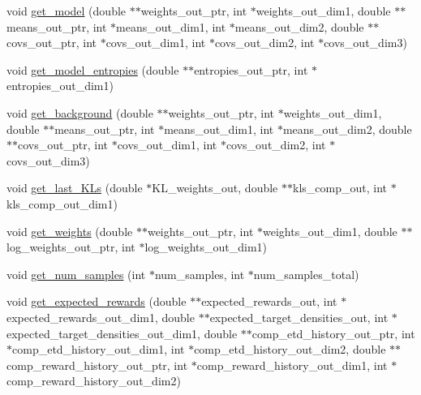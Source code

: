 \begin{DoxyCompactItemize}
void \hyperlink{classVIPS__PythonWrapper_acb7c2dea0de7913cc96a8d9511cd96a8}{get\+\_\+model} (double $\ast$$\ast$weights\+\_\+out\+\_\+ptr, int $\ast$weights\+\_\+out\+\_\+dim1, double $\ast$$\ast$means\+\_\+out\+\_\+ptr, int $\ast$means\+\_\+out\+\_\+dim1, int $\ast$means\+\_\+out\+\_\+dim2, double $\ast$$\ast$covs\+\_\+out\+\_\+ptr, int $\ast$covs\+\_\+out\+\_\+dim1, int $\ast$covs\+\_\+out\+\_\+dim2, int $\ast$covs\+\_\+out\+\_\+dim3)
\item 
void \hyperlink{classVIPS__PythonWrapper_acaee5a15878205a9ad0ce90c0ffbbdec}{get\+\_\+model\+\_\+entropies} (double $\ast$$\ast$entropies\+\_\+out\+\_\+ptr, int $\ast$entropies\+\_\+out\+\_\+dim1)
\item 
void \hyperlink{classVIPS__PythonWrapper_a2cf72db0bbb7259955d9229ab768cf6b}{get\+\_\+background} (double $\ast$$\ast$weights\+\_\+out\+\_\+ptr, int $\ast$weights\+\_\+out\+\_\+dim1, double $\ast$$\ast$means\+\_\+out\+\_\+ptr, int $\ast$means\+\_\+out\+\_\+dim1, int $\ast$means\+\_\+out\+\_\+dim2, double $\ast$$\ast$covs\+\_\+out\+\_\+ptr, int $\ast$covs\+\_\+out\+\_\+dim1, int $\ast$covs\+\_\+out\+\_\+dim2, int $\ast$covs\+\_\+out\+\_\+dim3)
\item 
void \hyperlink{classVIPS__PythonWrapper_aa48468dd40833596d32e202fade3af84}{get\+\_\+last\+\_\+\+K\+Ls} (double $\ast$K\+L\+\_\+weights\+\_\+out, double $\ast$$\ast$kls\+\_\+comp\+\_\+out, int $\ast$kls\+\_\+comp\+\_\+out\+\_\+dim1)
\item 
void \hyperlink{classVIPS__PythonWrapper_a6533e3114818b6dc596a51bb8d8aae32}{get\+\_\+weights} (double $\ast$$\ast$weights\+\_\+out\+\_\+ptr, int $\ast$weights\+\_\+out\+\_\+dim1, double $\ast$$\ast$log\+\_\+weights\+\_\+out\+\_\+ptr, int $\ast$log\+\_\+weights\+\_\+out\+\_\+dim1)
\item 
void \hyperlink{classVIPS__PythonWrapper_aa650a92bb89042882d548a16fdf46205}{get\+\_\+num\+\_\+samples} (int $\ast$num\+\_\+samples, int $\ast$num\+\_\+samples\+\_\+total)
\item 
void \hyperlink{classVIPS__PythonWrapper_acafd12e5bc30f51b703a73606d76de40}{get\+\_\+expected\+\_\+rewards} (double $\ast$$\ast$expected\+\_\+rewards\+\_\+out, int $\ast$expected\+\_\+rewards\+\_\+out\+\_\+dim1, double $\ast$$\ast$expected\+\_\+target\+\_\+densities\+\_\+out, int $\ast$expected\+\_\+target\+\_\+densities\+\_\+out\+\_\+dim1, double $\ast$$\ast$comp\+\_\+etd\+\_\+history\+\_\+out\+\_\+ptr, int $\ast$comp\+\_\+etd\+\_\+history\+\_\+out\+\_\+dim1, int $\ast$comp\+\_\+etd\+\_\+history\+\_\+out\+\_\+dim2, double $\ast$$\ast$comp\+\_\+reward\+\_\+history\+\_\+out\+\_\+ptr, int $\ast$comp\+\_\+reward\+\_\+history\+\_\+out\+\_\+dim1, int $\ast$comp\+\_\+reward\+\_\+history\+\_\+out\+\_\+dim2)

\end{DoxyCompactItemize}
